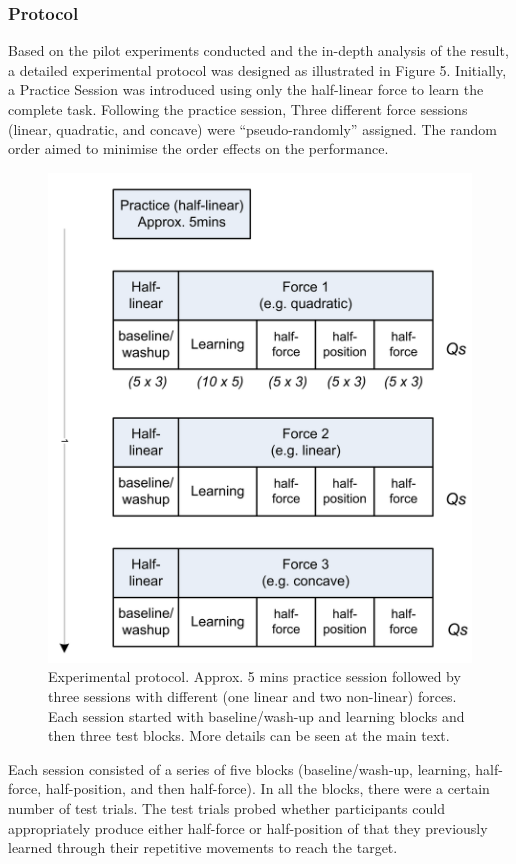 \subsubsection{Protocol}
Based on the pilot experiments conducted and the in-depth analysis of the result, a detailed experimental protocol was designed as illustrated in Figure 5. Initially, a Practice Session was introduced using only the half-linear force to learn the complete task. Following the practice session, Three different force sessions (linear, quadratic, and concave) were “pseudo-randomly” assigned. The random order aimed to minimise the order effects on the performance.
\begin{figure}
  \centering
  \includegraphics[scale=0.5]{Chie/figs/Figure5.png}
  \caption{Experimental protocol. Approx. 5 mins practice session followed by three sessions with different (one linear and two non-linear) forces. Each session started with baseline/wash-up and learning blocks and then three test blocks. More details can be seen at the main text.}
  \label{protocol}
\end{figure}
Each session consisted of a series of five blocks (baseline/wash-up, learning, half-force, half-position, and then half-force). In all the blocks, there were a certain number of test trials. The test trials probed whether participants could appropriately produce either half-force or half-position of that they previously learned through their repetitive movements to reach the target.

